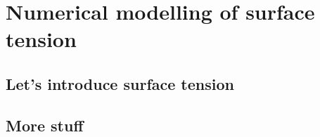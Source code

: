 \chapter{Numerical modelling of surface tension}\label{ch:st}
\startcontents[chapters]
\Mprintcontents

\section{Let's introduce surface tension}
\section{More stuff}

\begin{subappendices}
  
\end{subappendices}

\stopcontents[chapters]
